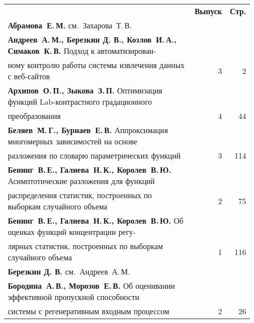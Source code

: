 {\tabcolsep=3pt
\begin{tabular}{p{388pt}rr}
&\textbf{Выпуск} & \textbf{Стр.}\\[6pt]
\textbf{Абрамова~Е.\,М.} см.~Захарова~Т.\,В.&&\\
\textbf{Андреев~А.\,М., Березкин Д. В., Козлов~И.\,А., Симаков~К.\,В.}
Подход к автоматизирован-\linebreak
\vspace*{-12pt}\\
\hspace*{23pt}ному контролю работы системы извлечения данных с веб-сайтов\dotfill&3&2\\
\textbf{Архипов~О.\,П., Зыкова~З.\,П.}
Оптимизация функций Lab-контрастного градационного\linebreak
\vspace*{-12pt}\\
\hspace*{23pt}преобразования\dotfill&4&44\\
\textbf{Беляев~М.\,Г., Бурнаев~Е.\,В.}
Аппроксимация многомерных зависимостей на основе\linebreak
\vspace*{-12pt}\\
\hspace*{23pt}разложения по словарю параметрических функций\dotfill&3&114\\
\textbf{Бенинг~В.\,Е., Галиева~Н.\,К., Королев~В.\,Ю.}
Асимптотические разложения для функций\linebreak
\vspace*{-12pt}\\
\hspace*{23pt}распределения статистик, построенных по
выборкам случайного объема\dotfill&2&75 \\
\textbf{Бенинг~В.\,Е., Галиева~Н.\,К., Королев~В.\,Ю.}
Об оценках функций концентрации регу-\linebreak
\vspace*{-12pt}\\
\hspace*{23pt}лярных статистик, построенных по выборкам случайного объема\dotfill&1&116\\
\textbf{Березкин Д. В.} см.~Андреев~А.\,М.&&\\
\textbf{Бородина~А.\,В., Морозов~Е.\,В.}
Об оценивании эффективной пропускной способности\linebreak
\vspace*{-12pt}\\
\hspace*{23pt}системы с регенеративным входным процессом\dotfill&2&26\\

\end{tabular}}
